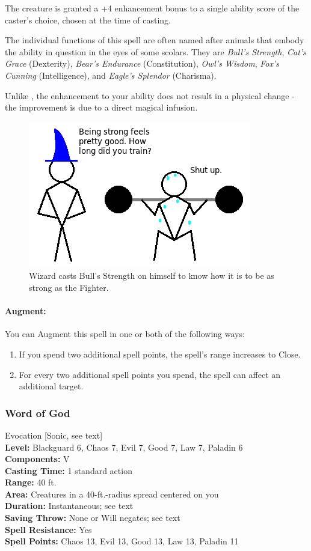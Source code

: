 The creature is granted a +4 enhancement bonus to a single ability score of the caster's choice, chosen at the time of casting. 

The individual functions of this spell are often named after animals that embody the ability in question in the
eyes of some scolars. They are \emph{Bull's Strength}, \emph{Cat's Grace} (Dexterity),
\emph{Bear's Endurance} (Constitution), \emph{Owl's Wisdom}, 
\emph{Fox's Cunning} (Intelligence), and \emph{Eagle's Splendor} (Charisma).

Unlike , the enhancement to your ability does not result in a physical change -
the improvement is due to a direct magical infusion.

\begin{figure}
  \caption{Wizard casts Bull's Strength on himself to know how it is to be as strong as the Fighter.}
  \centering
    \includegraphics{Pics/Wombat.png}
\end{figure}

\paragraph{Augment:} You can Augment this spell in one or both of the following ways:
\begin{enumerate}
 \item If you spend two additional spell points, the spell's range increases to Close.
 \item For every two additional spell points you spend, the spell can affect an additional target.
\end{enumerate}
\subsubsection{Word of God}
\label{Spell:WordOfGod}
Evocation [Sonic, see text]
\\ \textbf{Level:} Blackguard 6, Chaos 7, Evil 7, Good 7, Law 7, Paladin 6
\\ \textbf{Components:} V
\\ \textbf{Casting Time:} 1 standard action
\\ \textbf{Range:} 40 ft.
\\ \textbf{Area:} Creatures in a 40-ft.-radius spread centered on you
\\ \textbf{Duration:} Instantaneous; see text
\\ \textbf{Saving Throw:} None or Will negates; see text
\\ \textbf{Spell Resistance:} Yes
\\ \textbf{Spell Points:} Chaos 13, Evil 13, Good 13, Law 13, Paladin 11


